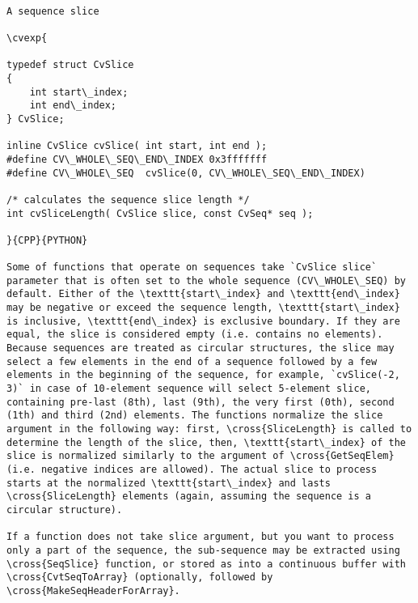 \begin{verbatim}

A sequence slice

\cvexp{

typedef struct CvSlice
{
    int start\_index;
    int end\_index;
} CvSlice;

inline CvSlice cvSlice( int start, int end );
#define CV\_WHOLE\_SEQ\_END\_INDEX 0x3fffffff
#define CV\_WHOLE\_SEQ  cvSlice(0, CV\_WHOLE\_SEQ\_END\_INDEX)

/* calculates the sequence slice length */
int cvSliceLength( CvSlice slice, const CvSeq* seq );

}{CPP}{PYTHON}

Some of functions that operate on sequences take `CvSlice slice` parameter that is often set to the whole sequence (CV\_WHOLE\_SEQ) by default. Either of the \texttt{start\_index} and \texttt{end\_index} may be negative or exceed the sequence length, \texttt{start\_index} is inclusive, \texttt{end\_index} is exclusive boundary. If they are equal, the slice is considered empty (i.e. contains no elements). Because sequences are treated as circular structures, the slice may select a few elements in the end of a sequence followed by a few elements in the beginning of the sequence, for example, `cvSlice(-2, 3)` in case of 10-element sequence will select 5-element slice, containing pre-last (8th), last (9th), the very first (0th), second (1th) and third (2nd) elements. The functions normalize the slice argument in the following way: first, \cross{SliceLength} is called to determine the length of the slice, then, \texttt{start\_index} of the slice is normalized similarly to the argument of \cross{GetSeqElem} (i.e. negative indices are allowed). The actual slice to process starts at the normalized \texttt{start\_index} and lasts \cross{SliceLength} elements (again, assuming the sequence is a circular structure).

If a function does not take slice argument, but you want to process only a part of the sequence, the sub-sequence may be extracted using \cross{SeqSlice} function, or stored as into a continuous buffer with \cross{CvtSeqToArray} (optionally, followed by \cross{MakeSeqHeaderForArray}.


\end{verbatim}
